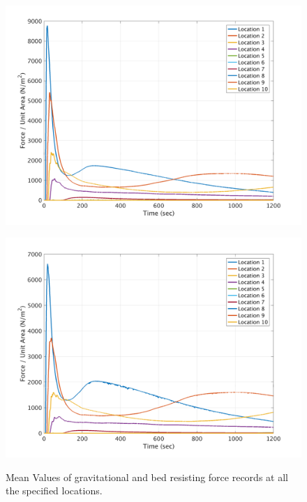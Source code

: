 \documentclass[a4paper,10pt]{article}
\begin{document}
\begin{figure}[H]
	\begin{minipage}[b]{0.5\linewidth}
	\centering
    \includegraphics[width=1\textwidth]{MeansAll/FgravV_all.png}
        \label{fig:M_FgVall}
	\end{minipage}
	\begin{minipage}[b]{0.5\linewidth}
	\centering
    \includegraphics[width=1\textwidth]{MeansAll/FbedV_all.png}
        \label{fig:M_FbVall}
	\end{minipage}

	\caption{Mean Values of gravitational and bed resisting force records at all the specified locations.}\label{fig:M_Fgball}
\end{figure}
\end{document}
